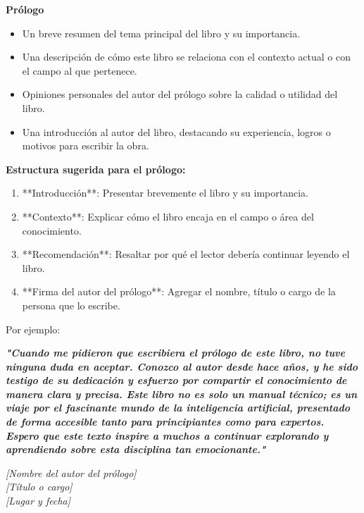 
\vspace*{2cm}

{\Huge \textbf{Prólogo}} \\[1.0cm]
 
\begin{itemize}
    \item Un breve resumen del tema principal del libro y su importancia.
    \item Una descripción de cómo este libro se relaciona con el contexto actual o con el campo al que pertenece.
    \item Opiniones personales del autor del prólogo sobre la calidad o utilidad del libro.
    \item Una introducción al autor del libro, destacando su experiencia, logros o motivos para escribir la obra.
\end{itemize}


\vspace{1em}

\textbf{Estructura sugerida para el prólogo:}
\begin{enumerate}
    \item **Introducción**: Presentar brevemente el libro y su importancia.
    \item **Contexto**: Explicar cómo el libro encaja en el campo o área del conocimiento.
    \item **Recomendación**: Resaltar por qué el lector debería continuar leyendo el libro.
    \item **Firma del autor del prólogo**: Agregar el nombre, título o cargo de la persona que lo escribe.
\end{enumerate}

Por ejemplo:

\textit{}
\textbf{\textit{"Cuando me pidieron que escribiera el prólogo de este libro, no tuve ninguna duda en aceptar. Conozco al autor desde hace años, y he sido testigo de su dedicación y esfuerzo por compartir el conocimiento de manera clara y precisa. Este libro no es solo un manual técnico; es un viaje por el fascinante mundo de la inteligencia artificial, presentado de forma accesible tanto para principiantes como para expertos. Espero que este texto inspire a muchos a continuar explorando y aprendiendo sobre esta disciplina tan emocionante."}}


 
\vspace{2em}
\hfill \textit{[Nombre del autor del prólogo]} \\
\hfill \textit{[Título o cargo]} \\
\hfill \textit{[Lugar y fecha]} \\
\clearpage